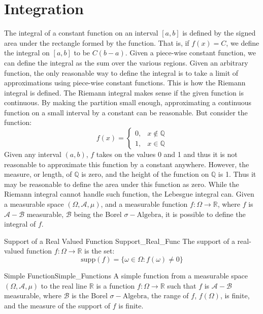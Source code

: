 \section{Integration}
    The integral of a constant function on an interval
    $[a,b]$ is defined by the signed area under the
    rectangle formed by the function. That is, if
    $f(x)=C$, we define the integral on $[a,b]$ to
    be $C(b-a)$. Given a piece-wise constant function,
    we can define the integral as the sum over the
    various regions. Given an arbitrary function, the
    only reasonable way to define the integral is to
    take a limit of approximations using piece-wise
    constant functions. This is how the Riemann integral
    is defined. The Riemann integral makes sense if
    the given function is continuous. By making the
    partition small enough, approximating a continuous
    function on a small interval by a constant can be
    reasonable. But consider the function:
    \begin{equation}
        f(x)=
        \begin{cases}
            0,&x\notin\mathbb{Q}\\
            1,&x\in\mathbb{Q}
        \end{cases}
    \end{equation}
    Given any interval $(a,b)$, $f$ takes on the values
    0 and 1 and thus it is not reasonable to approximate
    this function by a constant anywhere. However,
    the measure, or length, of $\mathbb{Q}$ is zero, and
    the height of the function on $\mathbb{Q}$ is 1.
    Thus it may be reasonable to define the area under
    this function as zero. While the Riemann integral
    cannot handle such function, the Lebesgue integral
    can. Given a measurable space
    $(\Omega,\mathcal{A},\mu)$, and a measurable
    function $f:\Omega\rightarrow\mathbb{R}$, where
    $f$ is $\mathcal{A}-\mathcal{B}$ measurable,
    $\mathcal{B}$ being the Borel
    $\sigma-\textrm{Algebra}$, it is possible to define
    the integral of $f$.
    \begin{ldefinition}{Support of a Real Valued Function}
          {Support_Real_Func}
        The support of a real-valued function
        $f:\Omega\rightarrow\mathbb{R}$ is the set:
        \begin{equation}
            \mathrm{supp}(f)=\{\omega\in\Omega:f(\omega)\ne{0}\}
        \end{equation}
    \end{ldefinition}
    \begin{ldefinition}{Simple Function}{Simple_Functions}
        A simple function from a measurable space
        $(\Omega,\mathcal{A},\mu)$ to the real line
        $\mathbb{R}$ is a function
        $f:\Omega\rightarrow\mathbb{R}$ such that
        $f$ is $\mathcal{A}-\mathcal{B}$ measurable,
        where $\mathcal{B}$ is the Borel
        $\sigma-\textrm{Algebra}$, the range of $f$,
        $f(\Omega)$, is finite, and the measure of the
        support of $f$ is finite.
    \end{ldefinition}
